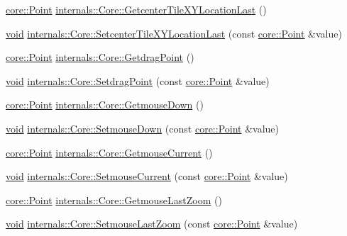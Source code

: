 \begin{DoxyCompactItemize}
\item 
\hyperlink{structcore_1_1_point}{core\-::\-Point} \hyperlink{group___o_p_map_widget_ga616220d474720ed46411357fb48ce323}{internals\-::\-Core\-::\-Getcenter\-Tile\-X\-Y\-Location\-Last} ()
\item 
\hyperlink{group___u_a_v_objects_plugin_ga444cf2ff3f0ecbe028adce838d373f5c}{void} \hyperlink{group___o_p_map_widget_ga3e20d2d38fb1001ab294401f10798932}{internals\-::\-Core\-::\-Setcenter\-Tile\-X\-Y\-Location\-Last} (const \hyperlink{structcore_1_1_point}{core\-::\-Point} \&value)
\item 
\hyperlink{structcore_1_1_point}{core\-::\-Point} \hyperlink{group___o_p_map_widget_ga3e7f3a15092c88e62abd7ae055b83ca9}{internals\-::\-Core\-::\-Getdrag\-Point} ()
\item 
\hyperlink{group___u_a_v_objects_plugin_ga444cf2ff3f0ecbe028adce838d373f5c}{void} \hyperlink{group___o_p_map_widget_ga26fe0b642c132f54f8b89fcca245559d}{internals\-::\-Core\-::\-Setdrag\-Point} (const \hyperlink{structcore_1_1_point}{core\-::\-Point} \&value)
\item 
\hyperlink{structcore_1_1_point}{core\-::\-Point} \hyperlink{group___o_p_map_widget_ga876eaa6494c4f0ca0a57b04aca2b63a7}{internals\-::\-Core\-::\-Getmouse\-Down} ()
\item 
\hyperlink{group___u_a_v_objects_plugin_ga444cf2ff3f0ecbe028adce838d373f5c}{void} \hyperlink{group___o_p_map_widget_ga393d5a89d61e2207a9cf54cd7a7e86db}{internals\-::\-Core\-::\-Setmouse\-Down} (const \hyperlink{structcore_1_1_point}{core\-::\-Point} \&value)
\item 
\hyperlink{structcore_1_1_point}{core\-::\-Point} \hyperlink{group___o_p_map_widget_ga4d84ca5c68011460943e7cb0a2d9ecaa}{internals\-::\-Core\-::\-Getmouse\-Current} ()
\item 
\hyperlink{group___u_a_v_objects_plugin_ga444cf2ff3f0ecbe028adce838d373f5c}{void} \hyperlink{group___o_p_map_widget_ga5e6d344e7c74efe498222b7a343e4a80}{internals\-::\-Core\-::\-Setmouse\-Current} (const \hyperlink{structcore_1_1_point}{core\-::\-Point} \&value)
\item 
\hyperlink{structcore_1_1_point}{core\-::\-Point} \hyperlink{group___o_p_map_widget_gac8e4aec0ad2357d32955a5cd6896d330}{internals\-::\-Core\-::\-Getmouse\-Last\-Zoom} ()
\item 
\hyperlink{group___u_a_v_objects_plugin_ga444cf2ff3f0ecbe028adce838d373f5c}{void} \hyperlink{group___o_p_map_widget_ga04c566589849ca7f9b3357accf403a55}{internals\-::\-Core\-::\-Setmouse\-Last\-Zoom} (const \hyperlink{structcore_1_1_point}{core\-::\-Point} \&value)

\end{DoxyCompactItemize}
